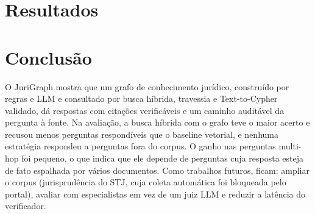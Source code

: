 \documentclass[12pt]{article}
\begin{document}
\section{Resultados}





\section{Conclusão}

O JuriGraph mostra que um grafo de conhecimento jurídico, construído por regras e LLM e consultado por busca
híbrida, travessia e Text-to-Cypher validado, dá respostas com citações verificáveis e um caminho auditável da
pergunta à fonte. Na avaliação, a busca híbrida com o grafo teve o maior acerto e recusou menos perguntas
respondíveis que o baseline vetorial, e nenhuma estratégia respondeu a perguntas fora do corpus. O ganho nas
perguntas multi-hop foi pequeno, o que indica que ele depende de perguntas cuja resposta esteja de fato
espalhada por vários documentos. Como trabalhos futuros, ficam: ampliar o corpus (jurisprudência do STJ, cuja coleta automática
foi bloqueada pelo portal), avaliar com especialistas em vez de um juiz LLM e reduzir a latência do verificador.



\end{document}
